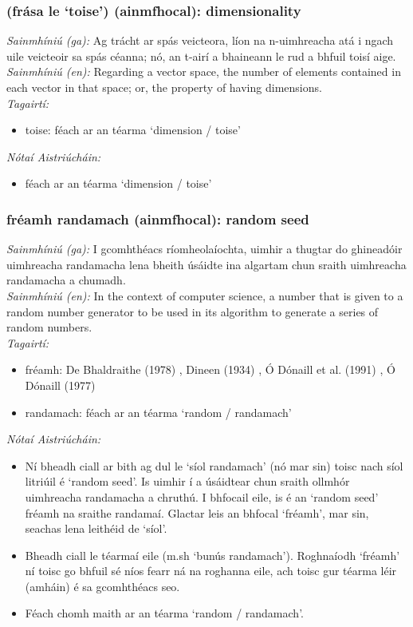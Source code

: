 \subsubsection*{(frása le `toise') (ainmfhocal): dimensionality}
 \noindent \textit{Sainmhíniú (ga):} Ag trácht ar spás veicteora, líon na n-uimhreacha atá i ngach uile veicteoir sa spás céanna; nó, an t-airí a bhaineann le rud a bhfuil toisí aige.
\\
 \noindent \textit{Sainmhíniú (en):} Regarding a vector space, the number of elements contained in each vector in that space; or, the property of having dimensions.
\\
 \noindent \textit{Tagairtí:}
\begin{itemize}
	\item toise: féach ar an téarma `dimension / toise'
\end{itemize}

 \noindent \textit{Nótaí Aistriúcháin:}
\begin{itemize}
	\item féach ar an téarma `dimension / toise'
\end{itemize}


\subsubsection*{fréamh randamach (ainmfhocal): random seed}
 \noindent \textit{Sainmhíniú (ga):} I gcomhthéacs ríomheolaíochta, uimhir a thugtar do ghineadóir uimhreacha randamacha lena bheith úsáidte ina algartam chun sraith uimhreacha randamacha a chumadh.
\\
 \noindent \textit{Sainmhíniú (en):} In the context of computer science, a number that is given to a random number generator to be used in its algorithm to generate a series of random numbers.
\\
 \noindent \textit{Tagairtí:}
\begin{itemize}
	\item fréamh: De Bhaldraithe (1978) \cite{de-bhaldraithe}, Dineen (1934) \cite{dineen}, Ó Dónaill et al. (1991) \cite{focloir-beag}, Ó Dónaill (1977) \cite{odonaill}
	\item randamach: féach ar an téarma `random / randamach'
\end{itemize}

 \noindent \textit{Nótaí Aistriúcháin:}
\begin{itemize}
	\item Ní bheadh ciall ar bith ag dul le `síol randamach' (nó mar sin) toisc nach síol litriúil é `random seed'. Is uimhir í a úsáidtear chun sraith ollmhór uimhreacha randamacha a chruthú. I bhfocail eile, is é an `random seed' fréamh na sraithe randamaí. Glactar leis an bhfocal `fréamh', mar sin, seachas lena leithéid de `síol'.
	\item Bheadh ciall le téarmaí eile (m.sh `bunús randamach'). Roghnaíodh `fréamh' ní toisc go bhfuil sé níos fearr ná na roghanna eile, ach toisc gur téarma léir (amháin) é sa gcomhthéacs seo.
	\item Féach chomh maith ar an téarma `random / randamach'.
\end{itemize}


